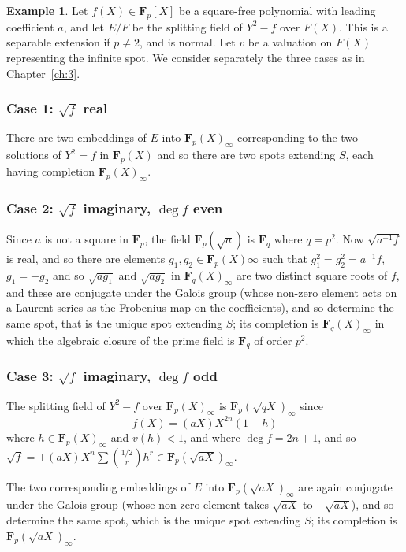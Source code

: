 \documentclass[10pt,leqno]{article}
\theoremstyle{definition}
\newtheorem{exam}[theo]{Example}
\def\FF{\mathbf{F}}
\begin{document}
\begin{exam}
\label{4.2.8}
Let $f(X) \in \FF_p[X]$ be a square-free polynomial with leading coefficient $a$, and let $E/F$ be the splitting field of $Y^2 - f$ over $F(X)$.
This is a separable extension if $p \not= 2$, and is normal.
Let $v$ be a valuation on $F(X)$ representing the infinite spot.
We consider separately the three cases as in Chapter~\ref{ch:3}.


\subsubsection[Case 1]{Case 1: $\sqrt f$ real}
\label{4.2.8.1}

There are two embeddings of $E$ into $\FF_p(X)_\infty$ corresponding to the two solutions of $Y^2 = f$ in $\FF_p(X)$ and so there are two spots extending $S$, each having completion $\FF_p(X)_\infty$.


\subsubsection[Case 2]{Case 2: $\sqrt f$ imaginary, $\deg f$ even}
\label{4.2.8.2}

Since $a$ is not a square in $\FF_p$, the field $\FF_p(\sqrt a)$ is $\FF_q$ where $q = p^2$.
Now $\sqrt{a^{-1}f}$ is real, and so there are elements $g_1,g_2 \in \FF_p(X)\infty$ such that $g_1^2 = g_2^2 = a^{-1}f$, $g_1 = -g_2$ and so $\sqrt{ag_1}$ and $\sqrt{ag_2}$ in $\FF_q(X)_\infty$ are two distinct square roots of $f$, and these are conjugate under the Galois group (whose non-zero element acts on a Laurent series as the Frobenius map on the coefficients), and so determine the same spot, that is the unique spot extending $S$; its completion is $\FF_q(X)_\infty$ in which the algebraic closure of the prime field is $\FF_q$ of order $p^2$.

\subsubsection[Case 3]{Case 3: $\sqrt f$ imaginary, $\deg f$ odd}
\label{4.2.8.3}

The splitting field of $Y^2 - f$ over $\FF_p(X)_\infty$ is $\FF_p(\sqrt{qX})_\infty$ since 
\[
f(X) = (aX) X^{2n} (1+h)
\]
where $h \in \FF_p(X)_\infty$ and $v(h) < 1$, and where $\deg f = 2n+1$, and so $\sqrt f = \pm (aX) X^n \sum \binom{1/2}{r} h^r \in \FF_p(\sqrt{aX})_\infty$.

The two corresponding embeddings of $E$ into $\FF_p(\sqrt{aX})_\infty$ are again conjugate under the Galois group (whose non-zero element takes $\sqrt{aX}$ to $-\sqrt{aX}$), and so determine the same spot, which is the unique spot extending $S$; its completion is $\FF_p(\sqrt{aX})_\infty$.


\end{exam}
\end{document}
